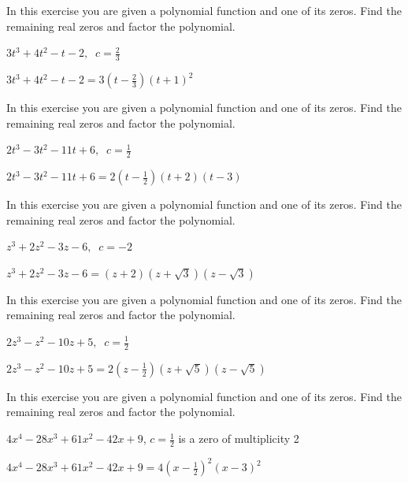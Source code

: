 \documentclass{ximera}
\begin{document}
\begin{problem}
In this exercise you are given a polynomial function and one of its zeros.  Find the remaining real zeros and factor the polynomial. 

$3t^{3} + 4t^{2} - t - 2, \;\; c = \frac{2}{3}$

\begin{solution}
$3t^{3} + 4t^{2} - t - 2 = 3\left(t - \frac{2}{3}\right)(t + 1)^{2}$
\end{solution}

\end{problem}

\begin{problem}
In this exercise you are given a polynomial function and one of its zeros.  Find the remaining real zeros and factor the polynomial. 

$2t^3-3t^2-11t+6, \;\; c=\frac{1}{2}$

\begin{solution}
$2t^3-3t^2-11t+6 = 2\left(t-\frac{1}{2}\right)(t+2)(t-3)$
\end{solution}
\end{problem}

\begin{problem}
In this exercise you are given a polynomial function and one of its zeros.  Find the remaining real zeros and factor the polynomial. 

$z^3+2z^2-3z-6, \;\; c = -2$

\begin{solution}
$z^3+2z^2-3z-6 = (z+2)(z+\sqrt{3})(z-\sqrt{3})$
\end{solution}


\end{problem}

\begin{problem}
In this exercise you are given a polynomial function and one of its zeros.  Find the remaining real zeros and factor the polynomial. 

$2z^3-z^2-10z+5, \;\; c=\frac{1}{2}$

\begin{solution}
$2z^3-z^2-10z+5=2\left(z-\frac{1}{2}\right)(z+\sqrt{5})(z-\sqrt{5})$
\end{solution}
\end{problem}

\begin{problem}
In this exercise you are given a polynomial function and one of its zeros.  Find the remaining real zeros and factor the polynomial. 

$4x^{4} - 28x^{3} + 61x^{2} - 42x + 9$, $c = \frac{1}{2}$ is a zero of multiplicity 2 

\begin{solution}
$4x^{4} - 28x^{3} + 61x^{2} - 42x + 9 = 4\left(x - \frac{1}{2} \right)^{2}(x - 3)^{2}$
\end{solution}

\end{problem}
\end{document}
